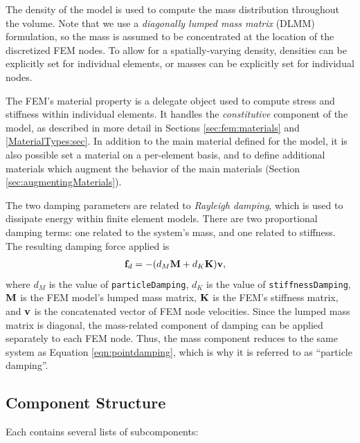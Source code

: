 The density of the model is used to compute the mass distribution
throughout the volume.  Note that we use a \emph{diagonally lumped
mass matrix} (DLMM) formulation, so the mass is assumed to be
concentrated at the location of the discretized FEM nodes.  To allow
for a spatially-varying density, densities can be explicitly set for
individual elements, or masses can be explicitly set for individual
nodes.

The FEM's {\sf material} property is a delegate object used to compute
stress and stiffness within individual elements.  It handles
the \emph{constitutive} component of the model, as described in more
detail in Sections \ref{sec:fem:materials}
and \ref{MaterialTypes:sec}.
In addition to the main material defined
for the model, it is also possible set a material on a per-element
basis, and to define additional materials which augment the behavior
of the main materials (Section \ref{sec:augmentingMaterials}).

The two damping parameters are related to \emph{Rayleigh damping}, which
is used to dissipate energy within finite element models.  There are two 
proportional damping terms: one related to the system's mass, and one related 
to stiffness.  The resulting damping force applied is
\begin{align}
	{\bf f}_d & = - (d_M {\bf M} + d_K{\bf K}){\bf v},
\end{align}
where $d_M$ is the value of {\tt particleDamping}, $d_K$ is the value of 
{\tt stiffnessDamping}, ${\bf M}$ is the FEM model's lumped mass matrix, ${\bf K}$ is 
the FEM's stiffness matrix, and ${\bf v}$ is the concatenated vector of FEM node
velocities.  Since the lumped mass matrix is diagonal, the mass-related
component of damping can be applied separately to each FEM node.  Thus, the
mass component reduces to the same system as Equation \eqref{eqn:pointdamping},
which is why it is referred to as ``particle damping''.

\subsection{Component Structure}
\label{sec:componentStructure}

Each  contains several 
lists of subcomponents:

